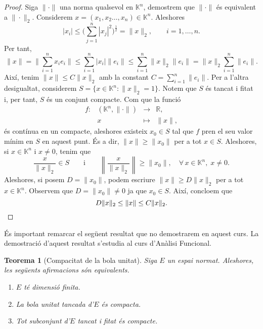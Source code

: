 \documentclass[12pt]{book}
\newtheorem{teorema}{Teorema}[chapter]
\theoremstyle{definition}
\theoremstyle{nota}
\theoremstyle{exemple}
\begin{document}
\begin{proof}
  Siga $\|\cdot\|$ una norma qualsevol en $\mathbb{K}^n$, demostrem
  que $\|\cdot\|$ és equivalent a $\|\cdot\|_2$. Considerem $x = (x_1, x_2 \dotsc, x_n) \in \mathbb{K}^n$. Aleshores
  \[
    |x_i| \leq \Big( \sum_{j=1}^{n} |x_j|^2 \Big)^{\frac{1}{2}} =
    \|x\|_2, \qquad i = 1, \dotsc, n.
  \]
  Per tant,
  \[
    \|x\| = \Big\| \sum_{i=1}^{n} x_i e_i \Big\| \leq \sum_{i=1}^{n}
    |x_i| \|e_i\| \leq \sum_{i=1}^{n} \|x\|_2 \|e_i\| = \|x\|_2
    \sum_{i=1}^{n} \|e_i\|.
  \]
  Així, tenim $\|x\| \leq C\|x\|_2$ amb la constant
  $C = \sum_{i=1}^{n} \|e_i\|$. Per a l'altra desigualtat, considerem
  $S = \{x \in \mathbb{K}^n : \|x\|_2 = 1\}$. Notem que $S$ és tancat
  i fitat i, per tant, $S$ és un conjunt compacte. Com que la funció
  \begin{equation*}
    \begin{array}{lrcl}
      f : & (\mathbb{K}^n, \|\cdot\|) & \longrightarrow & \mathbb{R}, \\
          & x & \longmapsto & \|x\|,
    \end{array}
  \end{equation*}
  és contínua en un compacte, aleshores existeix $x_0 \in S$ tal que
  $f$ pren el seu valor mínim en $S$ en aquest punt. És a dir,
  $\|x\| \geq \|x_0\|$ per a tot $x \in S$. Aleshores, si
  $x \in \mathbb{K}^n$ i $x \neq 0$, tenim que
  \[
    \frac{x}{\|x\|_2} \in S \qquad \text{i} \qquad \left\|
      \frac{x}{\|x\|_2} \right\| \geq \|x_0\|, \quad \forall\, x \in
    \mathbb{K}^n,\; x \neq 0.
  \]
  Aleshores, si posem $D = \|x_0\|$, podem escriure
  $\|x\| \geq D \|x\|_2$ per a tot $x \in \mathbb{K}^n$. Observem que
  $D = \|x_0\| \neq 0$ ja que $x_0 \in S$. Així, concloem que
  \[
    D \|x\|_2 \leq \|x\| \leq C \|x\|_2. \qedhere
  \]
\end{proof}

És important remarcar el següent resultat que no demostrarem en aquest
curs. La demostració d'aquest resultat s'estudia al curs d'Anàlisi
Funcional.

\begin{teorema}[Compacitat de la bola unitat]
  Siga $E$ un espai normat. Aleshores, les següents afirmacions són
  equivalents.
  \begin{enumerate}[nosep]
  \item $E$ té dimensió finita.
  \item La bola unitat tancada d'$E$ és compacta.
  \item Tot subconjunt d'$E$ tancat i fitat és compacte.
  \end{enumerate}
\end{teorema}
\end{document}
